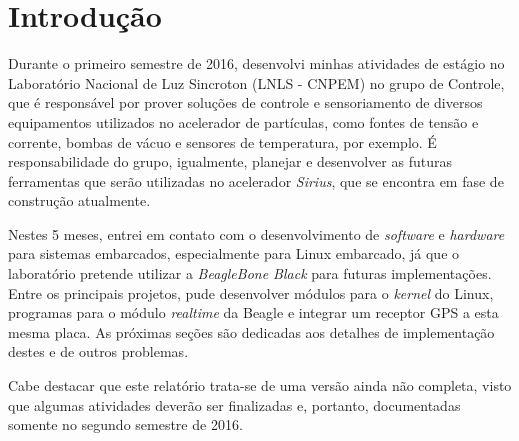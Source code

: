 \section {Introdução}

Durante o primeiro semestre de 2016, desenvolvi minhas atividades de estágio no
Laboratório Nacional de Luz Sincroton (LNLS - CNPEM) no grupo de Controle, que
é responsável por prover soluções de controle e sensoriamento de diversos
equipamentos utilizados no acelerador de partículas, como fontes de tensão e
corrente, bombas de vácuo e sensores de temperatura, por exemplo. É
responsabilidade do grupo, igualmente, planejar e desenvolver as futuras
ferramentas que serão utilizadas no acelerador \textit{Sirius}, que se encontra em fase de construção
atualmente.

\vspace{12pt}

Nestes 5 meses, entrei em contato com o desenvolvimento
de \textit{software} e \textit{hardware} para sistemas embarcados, especialmente
para Linux embarcado, já que o laboratório pretende utilizar a
\textit{BeagleBone Black} para futuras implementações. Entre os principais
projetos, pude desenvolver módulos para o \textit{kernel} do Linux, programas
para o módulo \textit{realtime} da Beagle e integrar um receptor GPS a esta
mesma placa. As próximas seções são dedicadas aos detalhes de implementação
destes e de outros problemas.

\vspace{12pt}

Cabe destacar que este relatório trata-se de uma versão ainda não completa,
visto que algumas atividades deverão ser finalizadas e, portanto, documentadas
somente no segundo semestre de 2016.
